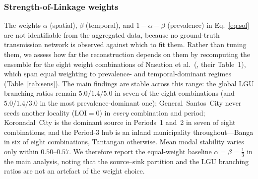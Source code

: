 \documentclass[a4paper,11pt]{article}
\begin{document}
\subsubsection*{Strength-of-Linkage weights}
The weights $\alpha$ (spatial), $\beta$ (temporal), and $1-\alpha-\beta$
(prevalence) in Eq.~\ref{eq:sol} are not identifiable from the aggregated data,
because no ground-truth transmission network is observed against which to fit them.
Rather than tuning them, we assess how far the reconstruction depends on them by
recomputing the ensemble for the eight weight combinations of Nasution et al.\
(\cite{Nasution2024}, their Table~1), which span equal weighting to prevalence- and
temporal-dominant regimes (Table~\ref{tab:sens}). The main findings are stable
across this range: the global LGU branching ratios remain $5.0/1.4/5.0$ in seven of
the eight combinations (and $5.0/1.4/3.0$ in the most prevalence-dominant one);
General~Santos~City never seeds another locality ($\mathrm{LOI}=0$) in \emph{every}
combination and period; Koronadal~City is the dominant source in Periods~1 and~2 in
seven of eight combinations; and the Period-3 hub is an inland municipality
throughout---Banga in six of eight combinations, Tantangan otherwise.
Mean modal stability varies only within $0.50$--$0.57$. We
therefore report the equal-weight baseline $\alpha=\beta=\tfrac13$ in the main
analysis, noting that the source--sink partition and the LGU branching ratios are
not an artefact of the weight choice.
\end{document}
